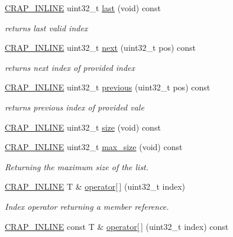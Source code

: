 \begin{DoxyCompactItemize}
\hyperlink{config__x86_8h_a5a40526b8d842e7ff731509998bb0f1c}{C\+R\+A\+P\+\_\+\+I\+N\+L\+I\+N\+E} uint32\+\_\+t \hyperlink{classcrap_1_1list_ae58d892b4fb67f2f1c41d1fa7a9db458}{last} (void) const 
\begin{DoxyCompactList}\small\item\em returns last valid index \end{DoxyCompactList}\item 
\hyperlink{config__x86_8h_a5a40526b8d842e7ff731509998bb0f1c}{C\+R\+A\+P\+\_\+\+I\+N\+L\+I\+N\+E} uint32\+\_\+t \hyperlink{classcrap_1_1list_afe067c95e97e08a7872f459710aff110}{next} (uint32\+\_\+t pos) const 
\begin{DoxyCompactList}\small\item\em returns next index of provided index \end{DoxyCompactList}\item 
\hyperlink{config__x86_8h_a5a40526b8d842e7ff731509998bb0f1c}{C\+R\+A\+P\+\_\+\+I\+N\+L\+I\+N\+E} uint32\+\_\+t \hyperlink{classcrap_1_1list_a41fdc3057f207b89b1c45c26e221b17c}{previous} (uint32\+\_\+t pos) const 
\begin{DoxyCompactList}\small\item\em returns previous index of provided vale \end{DoxyCompactList}\item 
\hyperlink{config__x86_8h_a5a40526b8d842e7ff731509998bb0f1c}{C\+R\+A\+P\+\_\+\+I\+N\+L\+I\+N\+E} uint32\+\_\+t \hyperlink{classcrap_1_1list_a43bed0e21b4168ab1d03bd4f15e5ef39}{size} (void) const 
\item 
\hyperlink{config__x86_8h_a5a40526b8d842e7ff731509998bb0f1c}{C\+R\+A\+P\+\_\+\+I\+N\+L\+I\+N\+E} uint32\+\_\+t \hyperlink{classcrap_1_1list_a41a8b5175164a73084ccd13407d7633b}{max\+\_\+size} (void) const 
\begin{DoxyCompactList}\small\item\em Returning the maximum size of the list. \end{DoxyCompactList}\item 
\hyperlink{config__x86_8h_a5a40526b8d842e7ff731509998bb0f1c}{C\+R\+A\+P\+\_\+\+I\+N\+L\+I\+N\+E} T \& \hyperlink{classcrap_1_1list_a17306f6051d7ad15f5d8ce729c4b9dc1}{operator\mbox{[}$\,$\mbox{]}} (uint32\+\_\+t index)
\begin{DoxyCompactList}\small\item\em Index operator returning a member reference. \end{DoxyCompactList}\item 
\hyperlink{config__x86_8h_a5a40526b8d842e7ff731509998bb0f1c}{C\+R\+A\+P\+\_\+\+I\+N\+L\+I\+N\+E} const T \& \hyperlink{classcrap_1_1list_a5885b0112e88dad71550bb8c226d17d6}{operator\mbox{[}$\,$\mbox{]}} (uint32\+\_\+t index) const 

\end{DoxyCompactItemize}
